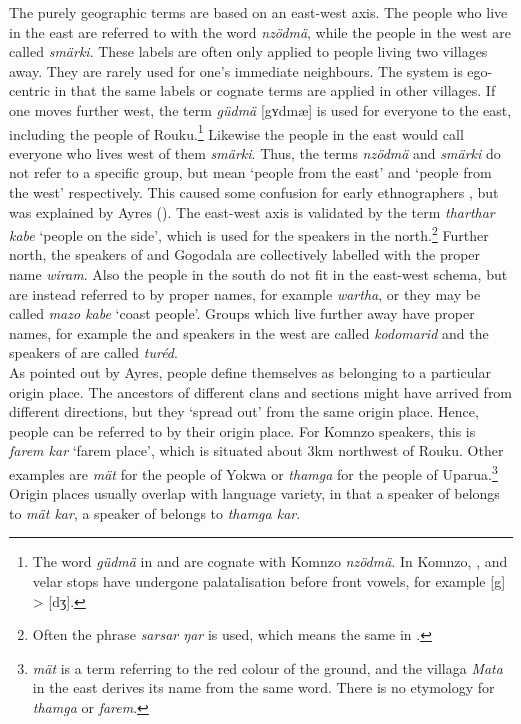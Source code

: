 The purely geographic terms are based on an east-west axis. The people who live in the east are referred to with the word \emph{nzödmä}, while the people in the west are called \emph{smärki}. These labels are often only applied to people living two villages away. They are rarely used for one's immediate neighbours. The system is ego-centric in that the same labels or cognate terms are applied in other villages. If one moves further west, the term \emph{güdmä} [gʏdmæ] is used for everyone to the east, including the people of Rouku.\footnote{The word \emph{güdmä} in  and  are cognate with Komnzo \emph{nzödmä}. In Komnzo, ,  and  velar stops have undergone palatalisation before front vowels, for example [g] > [dʒ].} Likewise the people in the east would call everyone who lives west of them \emph{smärki}. Thus, the terms \emph{nzödmä} and \emph{smärki} do not refer to a specific group, but mean `people from the east' and `people from the west' respectively. This caused some confusion for early ethnographers \citep[36]{Williams:1936transfly}, but was explained by Ayres (\citeyear[132]{Ayres:ws}). The east-west axis is validated by the term \emph{tharthar kabe} `people on the side', which is used for the  speakers in the north.\footnote{Often the phrase \emph{sarsar ŋar} is used, which means the same in .} Further north, the speakers of  and Gogodala are collectively labelled with the proper name \emph{wiram}. Also the people in the south do not fit in the east-west schema, but are instead referred to by proper names, for example \emph{wartha}, or they may be called \emph{mazo kabe} `coast people'. Groups which live further away have proper names, for example the  and  speakers in the west are called \emph{kodomarid} and the speakers of  are called \emph{turéd}.\\

As pointed out by Ayres, people define themselves as belonging to a particular origin place. The ancestors of different clans and sections might have arrived from different directions, but they `spread out' from the same origin place. Hence, people can be referred to by their origin place. For Komnzo speakers, this is \emph{farem kar} `farem place', which is situated about 3km northwest of Rouku. Other examples are \emph{mät} for the people of Yokwa or \emph{thamga} for the people of Uparua.\footnote{\emph{mät} is a term referring to the red colour of the ground, and the villaga \emph{Mata} in the east derives its name from the same word. There is no etymology for \emph{thamga} or \emph{farem}.} Origin places usually overlap with language variety, in that a speaker of  belongs to \emph{mät kar}, a speaker of  belongs to \emph{thamga kar}.\\

